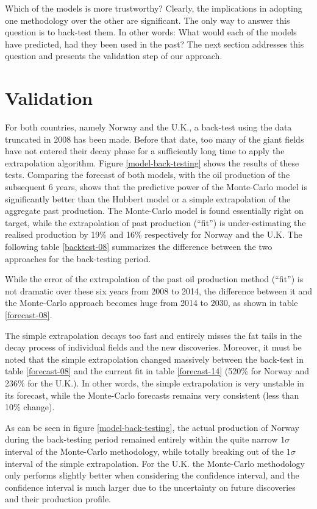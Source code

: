 \documentclass[review]{elsarticle}
\begin{document}
Which of the models is more trustworthy? Clearly, the implications
in adopting one methodology over the other are significant. The only
way to answer this question is to back-test them. In other words:
\textquotedbl{}What would each of the models have predicted, had they
been used in the past?\textquotedbl{} The next section addresses
this question and presents the validation step of our approach.


\section{Validation}

For both countries, namely Norway and the U.K., a back-test using
the data truncated in 2008 has been made. Before that date, too many
of the giant fields have not entered their decay phase for a sufficiently
long time to apply the extrapolation algorithm. Figure \ref{model-back-testing}
shows the results of these tests. Comparing the forecast of both models,
with the oil production of the subsequent 6 years, shows that the
predictive power of the Monte-Carlo model is significantly better than the Hubbert model or a simple extrapolation of the aggregate past production. The Monte-Carlo model is found essentially right on target, while the extrapolation of past production (``fit'') is under-estimating the realised production by 19\% and 16\% respectively for Norway and the U.K. The following table \ref{backtest-08} summarizes the difference between the two approaches for the back-testing period.

While the error of the extrapolation of the past oil production method (``fit'') is not dramatic over these six years from 2008 to 2014, the difference between it and the Monte-Carlo approach becomes huge from 2014 to 2030, as shown in table \ref{forecast-08}.

The simple extrapolation decays too fast and entirely misses the fat
tails in the decay process of individual fields and the new discoveries.
Moreover, it must be noted that the simple extrapolation changed massively
between the back-test in table \ref{forecast-08} and the current
fit in table \ref{forecast-14} (520\% for Norway and 236\% for the
U.K.). In other words, the simple extrapolation is very unstable
in its forecast, while the Monte-Carlo forecasts remains very consistent
(less than 10\% change).

As can be seen in figure \ref{model-back-testing}, the actual production
of Norway during the back-testing period remained entirely within
the quite narrow $1\sigma$ interval of the Monte-Carlo methodology,
while totally breaking out of the $1\sigma$ interval of the simple
extrapolation. For the U.K. the Monte-Carlo methodology only performs
slightly better when considering the confidence interval, and the
confidence interval is much larger due to the uncertainty on future
discoveries and their production profile.
\end{document}
